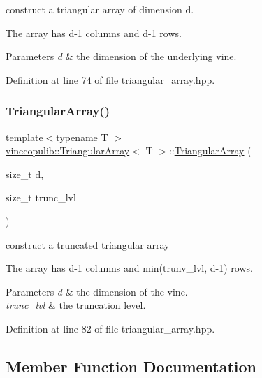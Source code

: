 construct a triangular array of dimension {\ttfamily d}. 

The array has {\ttfamily d-\/1} columns and {\ttfamily d-\/1} rows. 
\begin{DoxyParams}{Parameters}
{\em d} & the dimension of the underlying vine. \\
\hline
\end{DoxyParams}


Definition at line 74 of file triangular\+\_\+array.\+hpp.

\mbox{\label{classvinecopulib_1_1_triangular_array_a6c4a21f452a2c8094d452996f1f58401}} 
\subsubsection{\texorpdfstring{Triangular\+Array()}{TriangularArray()}\hspace{0.1cm}{\footnotesize\ttfamily [2/2]}}
{\footnotesize\ttfamily template$<$typename T $>$ \\
\hyperlink{classvinecopulib_1_1_triangular_array}{vinecopulib\+::\+Triangular\+Array}$<$ T $>$\+::\hyperlink{classvinecopulib_1_1_triangular_array}{Triangular\+Array} (\begin{DoxyParamCaption}\item[{size\+\_\+t}]{d,  }\item[{size\+\_\+t}]{trunc\+\_\+lvl }\end{DoxyParamCaption})}



construct a truncated triangular array 

The array has {\ttfamily d-\/1} columns and {\ttfamily min(trunv\+\_\+lvl, d-\/1)} rows. 
\begin{DoxyParams}{Parameters}
{\em d} & the dimension of the vine. \\
\hline
{\em trunc\+\_\+lvl} & the truncation level. \\
\hline
\end{DoxyParams}


Definition at line 82 of file triangular\+\_\+array.\+hpp.



\subsection{Member Function Documentation}
\mbox{\label{classvinecopulib_1_1_triangular_array_adb36a7916d7281707dcf50e40839bfb9}} 
